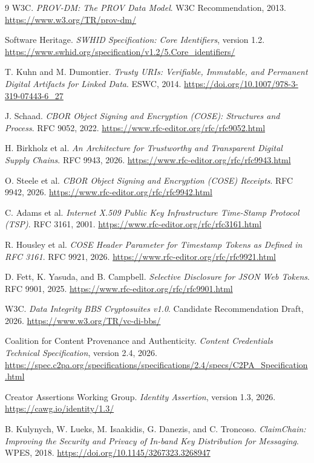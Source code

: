 \documentclass[11pt]{article}
\begin{document}
\begin{thebibliography}{9}
W3C. \emph{PROV-DM: The PROV Data Model}. W3C Recommendation, 2013. \url{https://www.w3.org/TR/prov-dm/}

Software Heritage. \emph{SWHID Specification: Core Identifiers}, version 1.2. \url{https://www.swhid.org/specification/v1.2/5.Core_identifiers/}

T. Kuhn and M. Dumontier. \emph{Trusty URIs: Verifiable, Immutable, and Permanent Digital Artifacts for Linked Data}. ESWC, 2014. \url{https://doi.org/10.1007/978-3-319-07443-6_27}

J. Schaad. \emph{CBOR Object Signing and Encryption (COSE): Structures and Process}. RFC 9052, 2022. \url{https://www.rfc-editor.org/rfc/rfc9052.html}

H. Birkholz et al. \emph{An Architecture for Trustworthy and Transparent Digital Supply Chains}. RFC 9943, 2026. \url{https://www.rfc-editor.org/rfc/rfc9943.html}

O. Steele et al. \emph{CBOR Object Signing and Encryption (COSE) Receipts}. RFC 9942,
2026. \url{https://www.rfc-editor.org/rfc/rfc9942.html}

C. Adams et al. \emph{Internet X.509 Public Key Infrastructure Time-Stamp Protocol (TSP)}. RFC 3161, 2001. \url{https://www.rfc-editor.org/rfc/rfc3161.html}

R. Housley et al. \emph{COSE Header Parameter for Timestamp Tokens as Defined in RFC 3161}. RFC 9921, 2026. \url{https://www.rfc-editor.org/rfc/rfc9921.html}

D. Fett, K. Yasuda, and B. Campbell. \emph{Selective Disclosure for JSON Web Tokens}. RFC 9901, 2025. \url{https://www.rfc-editor.org/rfc/rfc9901.html}

W3C. \emph{Data Integrity BBS Cryptosuites v1.0}. Candidate Recommendation Draft, 2026. \url{https://www.w3.org/TR/vc-di-bbs/}

Coalition for Content Provenance and Authenticity. \emph{Content Credentials
Technical Specification}, version 2.4, 2026.
\url{https://spec.c2pa.org/specifications/specifications/2.4/specs/C2PA_Specification.html}

Creator Assertions Working Group. \emph{Identity Assertion}, version 1.3,
2026. \url{https://cawg.io/identity/1.3/}

B. Kulynych, W. Lueks, M. Isaakidis, G. Danezis, and C. Troncoso.
\emph{ClaimChain: Improving the Security and Privacy of In-band Key
Distribution for Messaging}. WPES, 2018.
\url{https://doi.org/10.1145/3267323.3268947}


\end{thebibliography}
\end{document}
